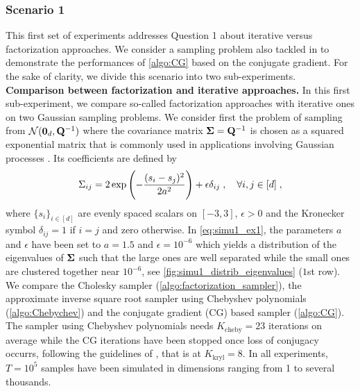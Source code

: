 \documentclass[nohypdvips,onefignum,onetabnum]{siamart171218}
\begin{document}
\subsubsection{Scenario 1}
\label{subsubsec:scenario1}
 This first set of experiments addresses Question 1 about iterative versus factorization approaches.
 We consider a sampling problem also tackled in \cite{Parker2012} to demonstrate the performances of \cref{algo:CG} based on the conjugate gradient.
For the sake of clarity, we divide this scenario into two sub-experiments.\\

\noindent\textbf{Comparison between factorization and iterative approaches.}
In this first sub-experiment, we compare so-called factorization approaches with iterative ones on two Gaussian sampling problems. We consider first the problem of sampling from $\mathcal{N}(\mathbf{0}_d,\mathbf{Q}^{-1})$ where the covariance matrix $\mathbf{\Sigma} = \mathbf{Q}^{-1}$ is chosen as a squared exponential matrix that is commonly used in applications involving Gaussian processes \cite{Higdon2007,MacKay2003,Rasmussen2003,Williams2006,Shi2000,Vasco1999}. Its coefficients are defined by
\begin{equation}
  \Sigma_{ij} = 2 \exp\pr{-\dfrac{(s_i-s_j)^2}{2a^2}} + \epsilon\delta_{ij}\eqsp, \quad \forall i,j \in [d]\eqsp, \label{eq:simu1_ex1}
\end{equation}
where $\{s_{i}\}_{i\in[d]}$ are evenly spaced scalars on $[-3,3]$, $\epsilon > 0$ and the Kronecker symbol $\delta_{ij} = 1$ if $i=j$ and zero otherwise.
In \cref{eq:simu1_ex1}, the parameters $a$ and $\epsilon$ have been set to $a = 1.5$ and $\epsilon = 10^{-6}$ which yields a distribution of the eigenvalues of $\mathbf{\Sigma}$ such that the large ones are well separated while the small ones are clustered together near $10^{-6}$, see \cref{fig:simu1_distrib_eigenvalues} ($1$st row).
We compare the Cholesky sampler (\cref{algo:factorization_sampler}), the approximate inverse square root sampler using Chebyshev polynomials (\cref{algo:Chebychev}) and the conjugate gradient (CG) based sampler (\cref{algo:CG}). 
The sampler using Chebyshev polynomials needs $K_{\mathrm{cheby}}=23$ iterations on average while the CG iterations have been stopped once loss of conjugacy occurrs, following the guidelines of \cite{Parker2012}, that is at $K_{\mathrm{kryl}}=8$.
In all experiments, $T=10^5$ samples have been simulated in dimensions ranging from 1 to several thousands.
\end{document}
